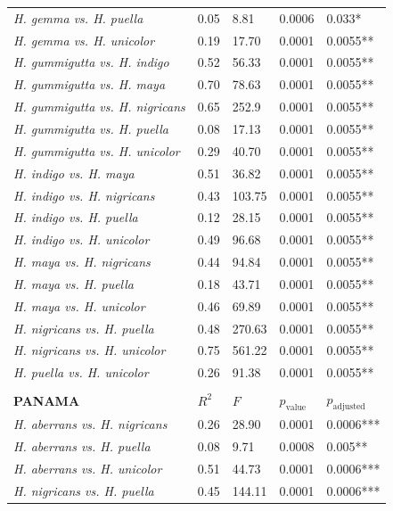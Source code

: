 \begin{xltabular}{\textwidth}{p{5cm}*{4}{X}}
    \emph{H. gemma vs. H. puella} & 0.05 & 8.81 & 0.0006 & 0.033* \\
    \emph{H. gemma vs. H. unicolor} & 0.19 & 17.70 & 0.0001 & 0.0055** \\
    \emph{H. gummigutta vs. H. indigo} & 0.52 & 56.33 & 0.0001 & 0.0055** \\
    \emph{H. gummigutta vs. H. maya} & 0.70 & 78.63 & 0.0001 & 0.0055** \\
    \emph{H. gummigutta vs. H. nigricans} & 0.65 & 252.9 & 0.0001 & 0.0055** \\
    \emph{H. gummigutta vs. H. puella} & 0.08 & 17.13 & 0.0001 & 0.0055** \\
    \emph{H. gummigutta vs. H. unicolor} & 0.29 & 40.70 & 0.0001 & 0.0055** \\
    \emph{H. indigo vs. H. maya} & 0.51 & 36.82 & 0.0001 & 0.0055** \\
    \emph{H. indigo vs. H. nigricans} & 0.43 & 103.75 & 0.0001 & 0.0055** \\
    \emph{H. indigo vs. H. puella} & 0.12 & 28.15 & 0.0001 & 0.0055** \\
    \emph{H. indigo vs. H. unicolor} & 0.49 & 96.68 & 0.0001 & 0.0055** \\
    \emph{H. maya vs. H. nigricans} & 0.44 & 94.84 & 0.0001 & 0.0055** \\
    \emph{H. maya vs. H. puella} & 0.18 & 43.71 & 0.0001 & 0.0055** \\
    \emph{H. maya vs. H. unicolor} & 0.46 & 69.89 & 0.0001 & 0.0055** \\
    \emph{H. nigricans vs. H. puella} & 0.48 & 270.63 & 0.0001 & 0.0055** \\
    \emph{H. nigricans vs. H. unicolor} & 0.75 & 561.22 & 0.0001 & 0.0055** \\
    \emph{H. puella vs. H. unicolor} & 0.26 & 91.38 & 0.0001 & 0.0055** \\ \\
    \hline \hline
    \textbf{PANAMA} & $R^2$ & $F$ & $p_{\text{value}}$ & $p_{\text{adjusted}}$\\
    \hline
    \hline
    \emph{H. aberrans vs. H. nigricans} & 0.26 & 28.90 & 0.0001 & 0.0006*** \\
    \emph{H. aberrans vs. H. puella} & 0.08 & 9.71 & 0.0008 & 0.005** \\
    \emph{H. aberrans vs. H. unicolor} & 0.51 & 44.73 & 0.0001 & 0.0006***
    \\
    \emph{H. nigricans vs. H. puella} & 0.45 & 144.11 & 0.0001 & 0.0006*** \\

\end{xltabular}
